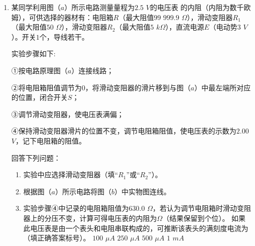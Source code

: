 
\begin{enumerate}[leftmargin=0em]
\renewcommand{\labelenumi}{\arabic{enumi}.}
\item
{}
某同学利用图（$ a $）所示电路测量量程为$ 2.5 $ $ V $的电压表 \voltmetermytikz 的内阻（内阻为数千欧姆），可供选择的器材有：电阻箱$ R $（最大阻值$ 99 $ $ 999.9 $ $ \Omega $），滑动变阻器$ R_{1} $（最大阻值$ 50 $ $ \Omega $），滑动变阻器$ R_{2} $（最大阻值$ 5 $ $ k \Omega $），直流电源$ E $（电动势$ 3 $ $ V $）。开关$ 1 $个，导线若干。
\begin{figure}[h!]
\centering
 \qquad \qquad 

\end{figure}

实验步骤如下:

①按电路原理图（$ a $）连接线路；

②将电阻箱阻值调节为$ 0 $，将滑动变阻器的滑片移到与图（$ a $）中最左端所对应的位置，闭合开关$ S $；

③调节滑动变阻器，使电压表满偏；

④保持滑动变阻器滑片的位置不变，调节电阻箱阻值，使电压表的示数为$ 2.00 $ $ V $，记下电阻箱的阻值。

回答下列问题：

\begin{enumerate}
\renewcommand{\labelenumi}{\arabic{enumi}.}
\item
实验中应选择滑动变阻器（填“$ R_{1} $”或“$ R_{2} $”）。
\item 
根据图（$ a $）所示电路将图（$ b $）中实物图连线。
\item 
实验步骤④中记录的电阻箱阻值为$ 630.0 $ $ \Omega $，若认为调节电阻箱时滑动变阻器上的分压不变，计算可得电压表的内阻为$ \Omega $（结果保留到个位）。
如果此电压表是由一个表头和电阻串联构成的，可推断该表头的满刻度电流为  
（填正确答案标号）。
\fourchoices
{$ 100 $ $ \mu A $}
{$ 250 $ $ \mu A $}
{$ 500 $ $ \mu A $}
{$ 1 $ $ mA $}


\end{enumerate}
\end{enumerate}
